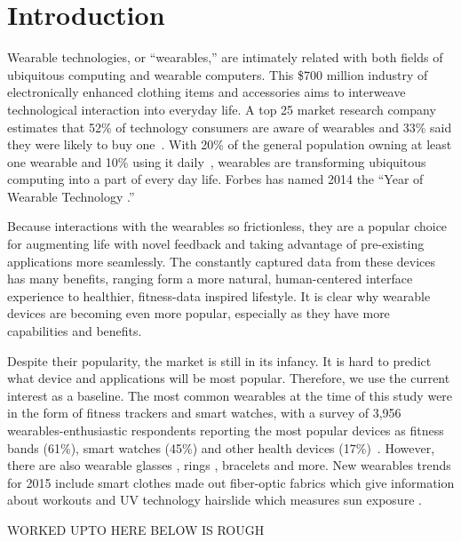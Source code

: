 
\section{Introduction}

Wearable technologies, or ``wearables,'' are intimately related with both fields of ubiquitous computing and wearable computers. This \$700 million industry \cite{cmo} of electronically enhanced clothing items and accessories aims to interweave technological interaction into everyday life. A top 25 market research company estimates that 52\% of technology consumers are aware of wearables and 33\% said they were likely to buy one~\cite{NPD}. With 20\% of the general population owning at least one wearable and 10\% using it daily~\cite{WearableStatNews}, wearables are transforming ubiquitous computing into a part of every day life. Forbes has named 2014 the ``Year of Wearable Technology \cite{Forbes}.''

Because interactions with the wearables so frictionless, they are a popular choice for augmenting life with novel feedback and taking advantage of pre-existing applications more seamlessly. The constantly captured data from these devices has many benefits, ranging form a more natural, human-centered interface experience to healthier, fitness-data inspired lifestyle. It is clear why wearable devices are becoming even more popular, especially as they have more capabilities and benefits. 

Despite their popularity, the market is still in its infancy. It is hard to predict what device and applications will be most popular. Therefore, we use the current interest as a baseline. The most common wearables at the time of this study were in the form of fitness trackers and smart watches, with a survey of 3,956 wearables-enthusiastic respondents reporting the most popular devices as fitness bands (61\%), smart watches (45\%) and other health devices (17\%)~\cite{Nilsen}.  However, there are also wearable glasses \cite{ 2_google_2014, 3_sony_global_2014}, rings \cite{4_ringly_2014}, bracelets \cite{5_intel_2014} and more. New wearables trends for 2015 include smart clothes made out fiber-optic fabrics which give information about workouts and UV technology hairslide which measures sun exposure \cite{1_digital_trends_2014, 2_arthur_2014}.

{\color {red} WORKED UPTO HERE BELOW IS ROUGH}


